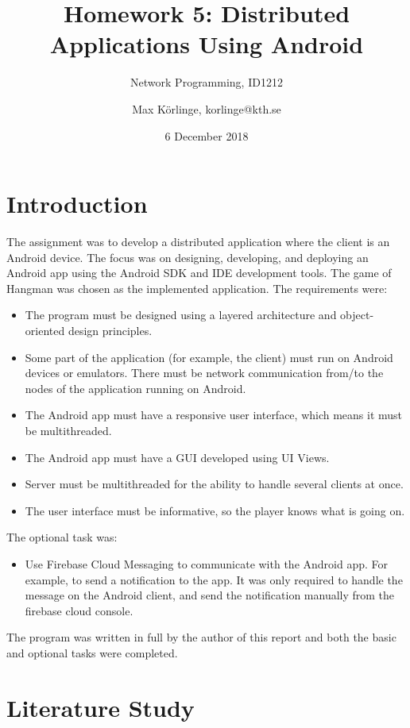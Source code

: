 \documentclass[a4paper]{scrartcl}
\title{Homework 5: Distributed Applications Using Android}
\subtitle{Network Programming, ID1212}
\author{Max Körlinge, korlinge@kth.se}
\date{6 December 2018}
\begin{document}
\maketitle


\section{Introduction}

\noindent The assignment was to develop a distributed application where the client is an Android device. The focus was on designing, developing, and deploying an Android app using the Android SDK and IDE development tools. The game of Hangman was chosen as the implemented application. The requirements were:

\begin{itemize}
    \item The program must be designed using a layered architecture and object-oriented design principles.
    \item Some part of the application (for example, the client) must run on Android devices or emulators. There must be network communication from/to the nodes of the application running on Android.
    \item The Android app must have a responsive user interface, which means it must be multithreaded.
    \item The Android app must have a GUI developed using UI Views.
    \item Server must be multithreaded for the ability to handle several clients at once.
    \item The user interface must be informative, so the player knows what is going on.
\end{itemize}

The optional task was:

\begin{itemize}
    \item Use Firebase Cloud Messaging to communicate with the Android app. For example, to send a notification to the app. It was only required to handle the message on the Android client, and send the notification manually from the firebase cloud console.
\end{itemize}

The program was written in full by the author of this report and both the basic and optional tasks were completed.

\section{Literature Study}
\end{document}
